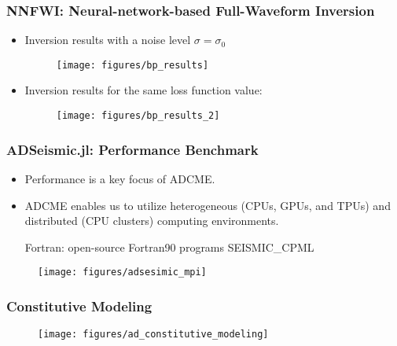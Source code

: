\documentclass[usenames,dvipsnames]{beamer}
\begin{document}
\begin{frame}
	\frametitle{NNFWI: Neural-network-based Full-Waveform Inversion}
	
	\begin{itemize}
		\item Inversion results with a noise level $\sigma = \sigma_0$
		\begin{figure}[hbt]
			\centering
			\texttt{[image: figures/bp\_results]}
		\end{figure}
		
		\item Inversion results for the same loss function value:
		\begin{figure}[hbt]
			\centering
			\texttt{[image: figures/bp\_results\_2]}
		\end{figure}
		
	\end{itemize}
	
\end{frame}

\begin{frame}
	\frametitle{ADSeismic.jl: Performance Benchmark}
	\begin{itemize}
		\item Performance is a key focus of ADCME.  
		\item ADCME enables us to utilize heterogeneous (CPUs, GPUs, and TPUs) and distributed (CPU clusters) computing environments.
		
		{\small Fortran: {open-source Fortran90 programs SEISMIC\_CPML}}
	\end{itemize}
	\begin{figure}[hbt]
		\texttt{[image: figures/adsesimic\_mpi]}
	\end{figure}
\end{frame}



\begin{frame}
	\frametitle{Constitutive Modeling}
	
	\begin{figure}[hbt]
		\centering
		\texttt{[image: figures/ad\_constitutive\_modeling]}
	\end{figure}
\end{frame}



\newcommand{\bsigma}[0]{\bm{\sigma}}
\newcommand{\bepsilon}[0]{\bm{\epsilon}}
\end{document}
